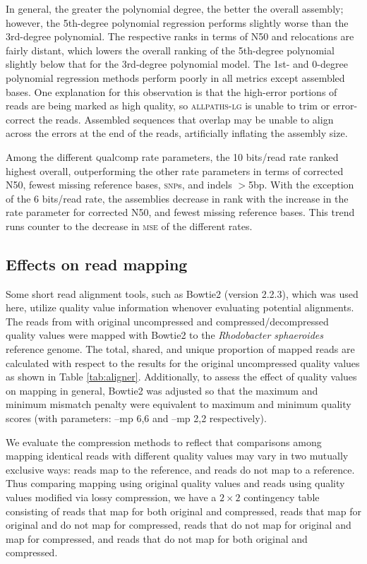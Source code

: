 \documentclass{bmcart}
\begin{document}
In general, the greater the polynomial degree, the better the overall
assembly; however, the 5th-degree polynomial regression performs
slightly worse than the 3rd-degree polynomial. The respective ranks in
terms of N50 and relocations are fairly distant, which lowers the
overall ranking of the 5th-degree polynomial slightly below that for
the 3rd-degree polynomial model. The 1st- and 0-degree polynomial
regression methods perform poorly in all metrics except assembled
bases. One explanation for this observation is that the high-error
portions of reads are being marked as high quality, so
\textsc{allpaths-lg} is unable to trim or error-correct the
reads. Assembled sequences that overlap may be unable to align across
the errors at the end of the reads, artificially inflating the
assembly size.

Among the different \textsc{q}ual\textsc{c}omp rate parameters, the 10
bits/read rate ranked highest overall, outperforming the other rate
parameters in terms of corrected N50, fewest missing reference bases,
\textsc{snp}s, and indels $>$5bp. With the exception of the 6
bits/read rate, the assemblies decrease in rank with the increase in
the rate parameter for corrected N50, and fewest missing reference
bases. This trend runs counter to the decrease in \textsc{mse} of the
different rates.

\subsection*{Effects on read mapping}

Some short read alignment tools, such as Bowtie2 (version 2.2.3),
which was used here, utilize quality value information whenover
evaluating potential alignments. The reads from with original
uncompressed and compressed/decompressed quality values were mapped
with Bowtie2 to the \textit{Rhodobacter sphaeroides} reference
genome. The total, shared, and unique proportion of mapped reads are
calculated with respect to the results for the original uncompressed
quality values as shown in Table \ref{tab:aligner}. Additionally, to
assess the effect of quality values on mapping in general, Bowtie2 was
adjusted so that the maximum and minimum mismatch penalty were
equivalent to maximum and minimum quality scores (with parameters:
--mp 6,6 and --mp 2,2 respectively).

We evaluate the compression methods to reflect that comparisons among
mapping identical reads with different quality values may vary in two
mutually exclusive ways: reads map to the reference, and reads do not
map to a reference. Thus comparing mapping using original quality
values and reads using quality values modified via lossy compression,
we have a $2 \times 2$ contingency table consisting of reads that map
for both original and compressed, reads that map for original and do
not map for compressed, reads that do not map for original and map for
compressed, and reads that do not map for both original and
compressed.
\end{document}
